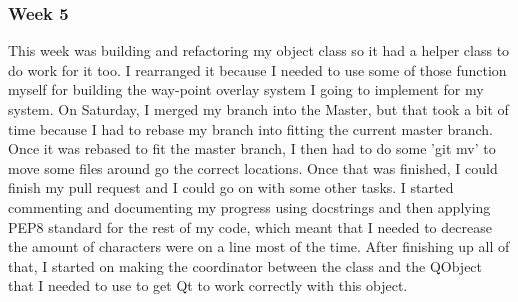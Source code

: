 \subsubsection{Week 5}
This week was building and refactoring my object class so it had a helper class to do work for it too.
I rearranged it because I needed to use some of those function myself for building the way-point overlay system I going to implement for my system.
On Saturday, I merged my branch into the Master, but that took a bit of time because I had to rebase my branch into fitting the current master branch.
Once it was rebased to fit the master branch, I then had to do some 'git mv' to move some files around go the correct locations.
Once that was finished, I could finish my pull request and I could go on with some other tasks.
I started commenting and documenting my progress using docstrings and then applying PEP8 standard for the rest of my code, which meant that I needed to decrease the amount of characters were on a line most of the time.
After finishing up all of that, I started on making the coordinator between the class and the QObject that I needed to use to get Qt to work correctly with this object.
